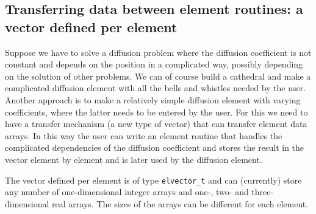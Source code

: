 \subsection{Transferring data between element routines:
a vector defined per element} 
\label{sec:elvector}

Suppose we have to solve a diffusion problem where the diffusion coefficient
is not constant and depends on the position in a complicated way, possibly
depending on the solution of other problems. We can of course build a cathedral
and make a complicated diffusion element with all the bells and whistles needed
by the user. Another approach is to make a relatively simple diffusion element
with varying coefficients, where the latter needs to be entered by the user.
For this we need to have a transfer mechanism (a new type of vector) that can
transfer element data arrays. In this way the user can write an element routine
that handles the complicated dependencies of the diffusion coefficient and
stores the result in the vector element by element and is later used by the
diffusion element.

The vector defined per element is of type \texttt{elvector\_t} and can
(currently) store
any number of one-dimensional integer arrays and one-, two- and 
three-dimensional real arrays. The sizes of the arrays can be different for
each element.

